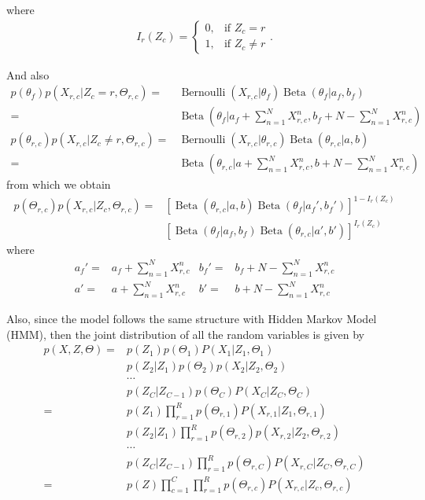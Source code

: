 \documentclass[11pt]{extarticle}
\newcommand{\0}{\mathbf{0}}
\renewcommand{\(}{\left(}
\renewcommand{\)}{\right)}
\DeclareMathOperator{\Beta}{Beta}
\DeclareMathOperator{\Bernoulli}{Bernoulli}
\theoremstyle{definition}
\begin{document}
where
\begin{align*}
	I_{r}(Z_{c}) = 	\begin{cases}
						0, & \text{if $Z_{c} = r$} \\
						1, & \text{if $Z_{c} \neq r$}
					\end{cases}.
\end{align*}
\par And also
\begin{align*}
	p(\theta_{f})p(X_{r,c} \vert Z_{c}=r, \Theta_{r,c}) =& \Bernoulli(X_{r,c} \vert \theta_{f}) \Beta(\theta_{f} \vert a_{f}, b_{f}) \\
	=& \Beta\left(\theta_{f} \vert a_{f} + \sum_{n=1}^{N} X^{n}_{r,c}, b_{f} + N - \sum_{n=1}^{N} X^{n}_{r,c}\right) \\
	p(\theta_{r,c})p(X_{r,c} \vert Z_{c}\neq r, \Theta_{r,c}) =& \Bernoulli(X_{r,c} \vert \theta_{r,c}) \Beta(\theta_{r,c} \vert a, b) \\
	=& \Beta\left(\theta_{r,c} \vert a + \sum_{n=1}^{N} X^{n}_{r,c}, b + N - \sum_{n=1}^{N} X^{n}_{r,c}\right)
\end{align*}
from which we obtain
\begin{align*}
	p(\Theta_{r,c})p(X_{r,c} \vert Z_{c}, \Theta_{r,c}) =& \left[\Beta(\theta_{r,c} \vert a, b)\Beta(\theta_{f} \vert a_{f}', b_{f}')\right]^{1-I_{r}(Z_{c})} \\
	& \left[\Beta(\theta_{f} \vert a_{f}, b_{f}) \Beta(\theta_{r,c}\vert a', b')\right]^{I_{r}(Z_{c})}
\end{align*}
where 
\begin{align*}
	a_{f}' =& a_{f} + \sum_{n=1}^{N} X^{n}_{r,c} &
	b_{f}' =& b_{f} + N - \sum_{n=1}^{N} X^{n}_{r,c} \\
	a' =& a + \sum_{n=1}^{N} X^{n}_{r,c} &
	b' =& b + N - \sum_{n=1}^{N} X^{n}_{r,c}
\end{align*}
\par Also, since the model follows the same structure with Hidden Markov Model (HMM), then the joint distribution of all the random variables is given by
\begin{align*}
	p(X, Z, \Theta) =& p(Z_{1}) p(\Theta_{1}) P(X_{1} \vert Z_{1}, \Theta_{1}) \\
	 & p(Z_{2} \vert Z_{1}) p(\Theta_{2}) p(X_{2} \vert Z_{2}, \Theta_{2}) \\
	 & \cdots \\
	 & p(Z_{C} \vert Z_{C-1}) p(\Theta_{C}) P(X_{C} \vert Z_{C}, \Theta_{C}) \\
	=& p(Z_{1}) \prod_{r=1}^{R} p(\Theta_{r,1}) P(X_{r,1} \vert Z_{1}, \Theta_{r,1}) \\
	 & p(Z_{2} \vert Z_{1}) \prod_{r=1}^{R} p(\Theta_{r,2}) p(X_{r,2} \vert Z_{2}, \Theta_{r,2}) \\
	 & \cdots \\
	 & p(Z_{C} \vert Z_{C-1}) \prod_{r=1}^{R} p(\Theta_{r,C}) P(X_{r,C} \vert Z_{C}, \Theta_{r,C}) \\
	=& p(Z) \prod_{c=1}^{C} \prod_{r=1}^{R} p(\Theta_{r,c}) P(X_{r,c} \vert Z_{c}, \Theta_{r,c})
\end{align*}
\end{document}
